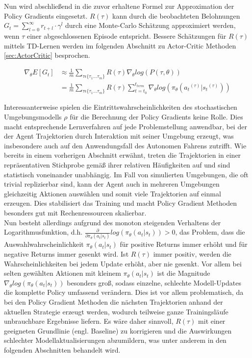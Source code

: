 Nun wird abschließend in die zuvor erhaltene Formel zur Approximation der Policy
Gradients eingesetzt. $R(\tau)$ kann durch die beobachteten Belohnungen
$G_t = \sum_{l=0}^{\infty} r_{t+l} \cdot \gamma^l$ durch eine Monte-Carlo Schätzung
approximiert werden, wenn $\tau$ einer abgeschlossenen Episode entspricht. Bessere Schätzungen
für $R(\tau)$ mittels TD-Lernen werden im folgenden Abschnitt zu Actor-Critic Methoden
\ref{sec:ActorCritic} besprochen.

\begin{equation}
\begin{aligned}
\nabla_\theta E[G_t]
&\approx \frac{1}{m} \sum_{\tau \epsilon \{ \tau_1 ... \tau_m \}}
    R(\tau) \nabla_\theta log(P(\tau, \theta))\\
&= \frac{1}{m} \sum_{\tau \epsilon \{ \tau_1 ... \tau_m \}} R(\tau) \sum_{t=t_0}^{t_{term}}
    \nabla_\theta log(\pi_\theta({a_t}^{(\tau)} | {s_t}^{(\tau)}))
\end{aligned}
\end{equation}

Interessanterweise spielen die Eintrittswahrscheinlichkeiten des stochastischen
Umgebungsmodells $\rho$ für die Berechnung der Policy Gradients keine Rolle.
Dies macht entsprechende Lernverfahren auf jede Problemstellung anwendbar,
bei der der Agent Trajektorien durch Interaktion mit seiner Umgebung erzeugt,
was insbesondere auch auf den Anwendungsfall des Autonomen Fahrens zutrifft.
Wie bereits in einem vorherigen Abschnitt erwähnt, treten die Trajektorien
in einer repräsentativen Stichprobe gemäß ihrer relativen Häufigkeiten auf
und sind statistisch voneinander unabhängig. Im Fall von simulierten Umgebungen,
die oft trivial replizierbar sind, kann der Agent auch in mehreren Umgebungen
gleichzeitig Aktionen auswählen und somit viele Trajektorien auf einmal erzeugen.
Dies stabilisiert das Training und macht Policy Gradient Methoden besonders
gut mit Rechenressourcen skalierbar.\\

Nun besteht allerdings aufgrund des monoton steigenden Verhaltens der Logarithmusfunktion,
d.h. $\frac{\partial}{\partial \pi_\theta({a_t} | {s_t})} log(\pi_\theta({a_t} | {s_t})) > 0$,
das Problem, dass die Auswahlwahrscheinlichkeit $\pi_\theta(a_t | s_t)$ für positive
Returns immer erhöht und für negative Returns immer gesenkt wird. Ist $R(\tau)$ immer
positiv, werden die Wahrscheinlichkeiten bei jedem Update erhöht, aber nie gesenkt.
Vor allem bei selten gewählten Aktionen mit kleinem $\pi_\theta({a_t} | {s_t})$
ist die Magnitude $\nabla_\theta log(\pi_\theta({a_t} | {s_t}))$ besonders groß,
sodass einzelne, schlechte Modell-Updates die komplette Policy umfassend verändern.
Dies ist vor allem problematisch, da bei den Policy Gradient
Methoden die nächsten Trajektorien anhand der aktuellen Strategie erzeugt werden,
wodurch teilweise ganze Trainingsläufe unbrauchbare Ergebnisse liefern.
Es wäre daher sinnvoll, $R(\tau)$ mit einer geeigneten Grundlinie (engl. Baseline)
zu korrigieren und die Auswirkungen schlechter Modellaktualisierungen abzumildern,
was unter anderem in den folgenden Abschnitten behandelt wird.

